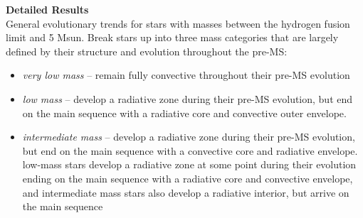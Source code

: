 \textbf{Detailed Results} \\
General evolutionary trends for stars with masses between the hydrogen fusion limit and 5 Msun. Break stars up into three mass categories that are largely defined by their structure and evolution throughout the pre-MS: 
\begin{itemize}
 \item[] {\it very low mass} -- remain fully convective throughout their pre-MS evolution
 \item[] {\it low mass} -- develop a radiative zone during their pre-MS evolution, but end on the main sequence with a radiative core and convective outer envelope.
 \item[] {\it intermediate mass} -- develop a radiative zone during their pre-MS evolution, but end on the main sequence with a convective core and radiative envelope.
low-mass stars develop a radiative zone at some point during their evolution ending on the main sequence with a radiative core and convective envelope, and intermediate mass stars also develop a radiative interior, but arrive on the main sequence
\end{itemize}